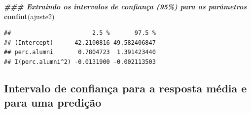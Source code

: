 \documentclass[
]{article}
\newenvironment{Shaded}{\begin{snugshade}}{\end{snugshade}}
\newcommand{\DocumentationTok}[1]{\textcolor[rgb]{0.56,0.35,0.01}{\textbf{\textit{#1}}}}
\newcommand{\FunctionTok}[1]{\textcolor[rgb]{0.13,0.29,0.53}{\textbf{#1}}}
\newcommand{\NormalTok}[1]{#1}
\begin{document}
\begin{Shaded}
\begin{Highlighting}[]
\DocumentationTok{\#\#\# Extraindo os intervalos de confiança (95\%) para os parâmetros}
\FunctionTok{confint}\NormalTok{(ajuste2)}
\end{Highlighting}
\end{Shaded}

\begin{verbatim}
##                       2.5 %       97.5 %
## (Intercept)      42.2100816 49.582406847
## perc.alumni       0.7804723  1.391423440
## I(perc.alumni^2) -0.0131900 -0.002113503
\end{verbatim}

\subsection{Intervalo de confiança para a resposta média e para uma
predição}\label{intervalo-de-confianuxe7a-para-a-resposta-muxe9dia-e-para-uma-prediuxe7uxe3o}
\end{document}
